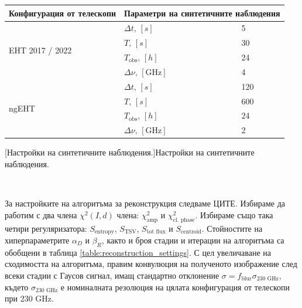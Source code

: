 \begin{minipage}{18em}
	\begin{center}
		\begin{tabular}{|| m{7.5em} | m{5em} | m{2em} ||}
			\hline 
			Конфигурация от телескопи & \multicolumn{2}{m{7em}||}{Параметри на синтетичните наблюдения} \\
			\hline
			\multirow{4}{7.5em}{\centering \small EHT 2017 / 2022} &\centering $\Delta t,\, [s]$    		& 5   \\ 
														&\centering $T,\,[s]$ 		     		& 30  \\ 
														&\centering $T_\text{obs},\,[h]$ 		& 24  \\
														&\centering $\Delta \nu,\,[\text{GHz}]$ & 4 \\
			\hline
			\multirow{4}{7.5em}{\centering \small ngEHT} 		  & \centering $\Delta t,\, [s]$    	   & 120 \\ 
													  & \centering $T,\,[s]$ 		      	   & 600 \\ 
												      & \centering $T_\text{obs},\,[h]$ 	   & 24  \\
												      & \centering $\Delta \nu,\,[\text{GHz}]$ & 2 \\
			\hline
		\end{tabular}
	\end{center}
	[Настройки на синтетичните наблюдения.]{Настройки на синтетичните наблюдения.}
	\label{table:ehtim_obs_settings}
\end{minipage}\,\,
\begin{minipage}{18em}
	За настройките на алгоритъма за реконструкция следваме ЦИТЕ. Избираме да работим с два члена $\chi^2(I,d)$ члена: $\chi^2_\text{amp}$ и $\chi^2_\text{cl. phase}$. Избираме също така четири регуляризатора: $S_\text{entropy}$, $S_\text{TSV}$, $S_\text{tot flux}$ и $S_\text{centroid}$. Стойностите на хиперпараметрите $\alpha_D$ и $\beta_R$, както и броя стадии и итерации на алгоритъма са обобщени в таблица \ref{table:reconstruction_settings}. С цел увеличаване на сходимостта на алгоритъма, правим конвулюция на полученото изображение след всеки стадии с Гаусов сигнал, имащ стандартно отклонение $\sigma = f_\text{blur} \sigma_{\text{230 GHz}}$, където $\sigma_{\text{230 GHz}}$ е номиналната резолюция на цялата конфигурация от телескопи при 230 GHz.
\end{minipage}

